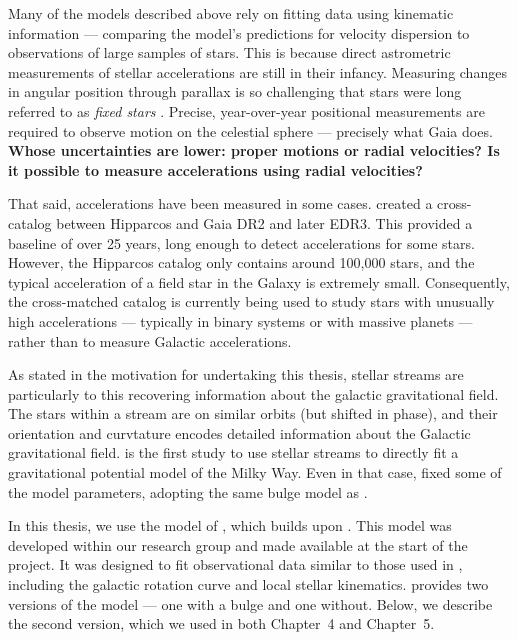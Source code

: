         Many of the models described above rely on fitting data using kinematic information — comparing the model's predictions for velocity dispersion to observations of large samples of stars. This is because direct astrometric measurements of stellar accelerations are still in their infancy. Measuring changes in angular position through parallax is so challenging that stars were long referred to as \textit{fixed stars} \citep{1981unht.book.....K}. Precise, year-over-year positional measurements are required to observe motion on the celestial sphere — precisely what Gaia does. \textbf{Whose uncertainties are lower: proper motions or radial velocities? Is it possible to measure accelerations using radial velocities?}

        That said, accelerations have been measured in some cases. \citet{2018ApJS..239...31B,2021ApJS..254...42B} created a cross-catalog between Hipparcos and Gaia DR2 \citep{2018A&A...616A...1G} and later EDR3. This provided a baseline of over 25 years, long enough to detect accelerations for some stars. However, the Hipparcos catalog only contains around 100,000 stars, and the typical acceleration of a field star in the Galaxy is extremely small. Consequently, the cross-matched catalog is currently being used to study stars with unusually high accelerations — typically in binary systems or with massive planets \citep{2023MNRAS.521.5232W,2025AJ....170...52G} — rather than to measure Galactic accelerations.

        As stated in the motivation for undertaking this thesis, stellar streams are particularly to this recovering information about the galactic gravitational field. The stars within a stream are on similar orbits (but shifted in phase), and their orientation and curvtature encodes detailed information about the Galactic gravitational field. \citet{2024ApJ...967...89I} is the first study to use stellar streams to directly fit a gravitational potential model of the Milky Way. Even in that case, \citet{2024ApJ...967...89I} fixed some of the model parameters, adopting the same bulge model as \citet{2017MNRAS.465...76M}.

        In this thesis, we use the model of \citet{2017A&A...598A..66P}, which builds upon \citet{1991RMxAA..22..255A}. This model was developed within our research group and made available at the start of the project. It was designed to fit observational data similar to those used in \citet{2015ApJS..216...29B}, including the galactic rotation curve and local stellar kinematics. \citet{2017A&A...598A..66P} provides two versions of the model — one with a bulge and one without. Below, we describe the second version, which we used in both Chapter~4 and Chapter~5.

